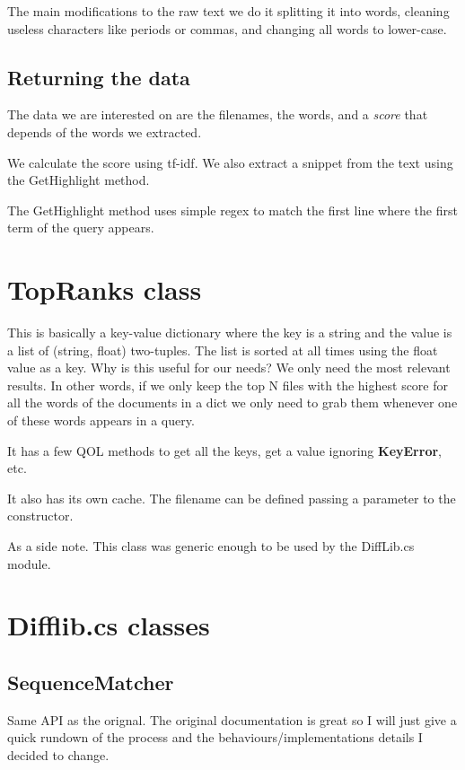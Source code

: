 \documentclass{report}
\begin{document}
The main modifications to the raw text we do it splitting it into words, cleaning useless characters like periods or commas, and changing all words to lower-case.

\subsection{Returning the data}

The data we are interested on are the filenames, the words, and a \emph{score} that depends of the words we extracted.

We calculate the score using tf-idf. We also extract a snippet from the text using the GetHighlight method.

The GetHighlight method uses simple regex to match the first line where the first term of the query appears.

\section{TopRanks class}

This is basically a key-value dictionary where the key is a string and the value is a list of (string, float) two-tuples. The list is sorted at all times using the float value as a key. Why is this useful for our needs? We only need the most relevant results. In other words, if we only keep the top N files with the highest score for all the words of the documents in a dict we only need to grab them whenever one of these words appears in a query.

It has a few QOL methods to get all the keys, get a value ignoring \textbf{KeyError}, etc.

It also has its own cache. The filename can be defined passing a parameter to the constructor.

As a side note. This class was generic enough to be used by the DiffLib.cs module.

\section{Difflib.cs classes}

\subsection{SequenceMatcher}

Same API as the orignal. The original documentation is great so I will just give a quick rundown of the process and the behaviours/implementations details I decided to change.
\end{document}
